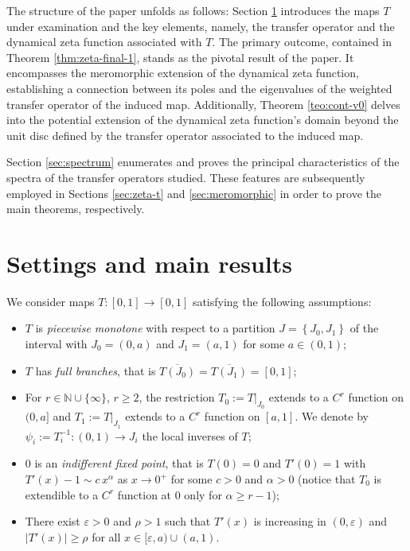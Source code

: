 \documentclass[11pt]{amsart}
\theoremstyle{definition}
\theoremstyle{remark}
\theoremstyle{definition}
\numberwithin{equation}{section}
\newcommand{\set}[1]{\left\{#1\right\}}
\newcommand{\N}{\mathbb N}
\newcommand{\eps}{\varepsilon}
\begin{document}
The structure of the paper unfolds as follows: Section \ref{sec:setting} introduces the maps $T$ under examination and the key elements, namely, the transfer operator and the dynamical zeta function associated with $T$. The primary outcome, contained in Theorem \ref{thm:zeta-final-1}, stands as the pivotal result of the paper. It encompasses the meromorphic extension of the dynamical zeta function, establishing a connection between its poles and the eigenvalues of the weighted transfer operator of the induced map. Additionally, Theorem \ref{teo:cont-v0} delves into the potential extension of the dynamical zeta function's domain beyond the unit disc defined by the transfer operator associated to the induced map.

Section \ref{sec:spectrum} enumerates and proves the principal characteristics of the spectra of the transfer operators studied. These features are subsequently employed in Sections \ref{sec:zeta-t} and \ref{sec:meromorphic} in order to prove the main theorems, respectively.

\section{Settings and main results} \label{sec:setting}

We consider maps $T:[0,1]\to [0,1]$ satisfying the following assumptions:
\begin{itemize}
\item[(H1)] $T$ is \emph{piecewise monotone} with respect to a partition $J =\set{J_0, J_1}$ of the interval with $J_0=(0,a)$ and $J_1=(a,1)$ for some $a\in (0,1)$;
\item[(H2)] $T$ has \emph{full branches}, that is $\overline{T(J_0)}=\overline{T(J_1)} =[0,1]$;
\item[(H3)] For $r\in \N\cup \{\infty\}$, $r\ge 2$, the restriction $T_0:=T|_{J_0}$ extends to a $C^r$ function on $(0,a]$ and $T_1:=T|_{J_1}$ extends to a $C^r$ function on $[a,1]$. We denote by $\psi_i := T_i^{-1} : (0,1) \to J_i$ the local inverses of $T$;
\item[(H4)] $0$ is an \emph{indifferent fixed point}, that is $T(0)=0$ and $T'(0)=1$ with $T'(x) -1 \sim c\, x^{\alpha}$ as $x\to 0^+$ for some $c>0$ and $\alpha > 0$ (notice that $T_0$ is extendible to a $C^r$ function at $0$ only for $\alpha \ge r-1$);
\item[(H5)] There exist $\eps>0$ and $\rho>1$ such that $T'(x)$ is increasing in $(0,\eps)$ and $|T'(x)|\ge \rho$ for all $x\in [\eps, a) \cup (a,1)$.
\end{itemize}
\end{document}
